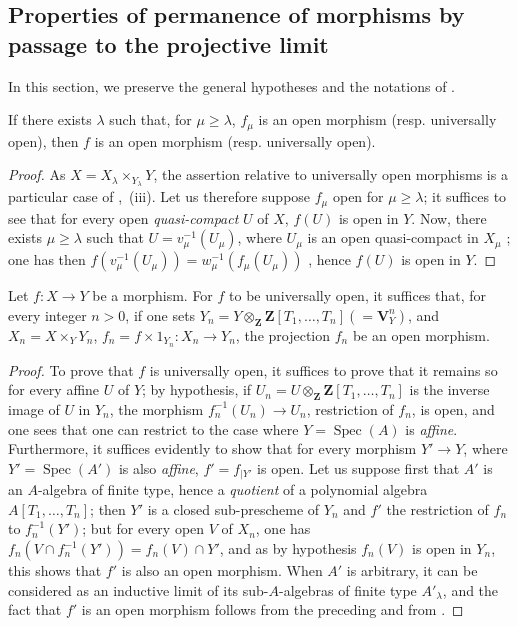 \subsection{Properties of permanence of morphisms by passage to the projective limit}
\label{subsection:IV.8.10}

In this section, we preserve the general hypotheses and the notations of .

\begin{proposition}[8.10.1]
\label{IV.8.10.1}
If there exists $\lambda$ such that, for $\mu\geqslant\lambda$, $f_\mu$ is an open morphism \textup{(resp.} universally open\textup{)}, then $f$ is an open morphism \textup{(resp.} universally open\textup{)}.
\end{proposition}

\begin{proof}
As $X=X_\lambda\times_{Y_\lambda}Y$, the assertion relative to universally open morphisms is a particular case of ,~(iii).
Let us therefore suppose $f_\mu$ open for $\mu\geqslant\lambda$; it suffices to see that for every open \emph{quasi-compact} $U$ of $X$, $f(U)$ is open in $Y$.
Now, there exists $\mu\geqslant\lambda$ such that $U=v_\mu^{-1}(U_\mu)$, where $U_\mu$ is an open quasi-compact in $X_\mu$ ; one has then $f(v_\mu^{-1}(U_\mu))=w_\mu^{-1}(f_\mu(U_\mu))$ , hence $f(U)$ is open in $Y$.
\end{proof}

\begin{corollary}[8.10.2]
\label{IV.8.10.2}
Let $f:X\to Y$ be a morphism.
For $f$ to be universally open, it suffices that, for every integer $n>0$, if one sets $Y_n=Y\otimes_\mathbf{Z}\mathbf{Z}[T_1,\ldots,T_n](=\mathbf{V}_Y^n)$, and $X_n=X\times_Y Y_n$, $f_n=f\times 1_{Y_n}:X_n\to Y_n$, the projection $f_n$ be an open morphism.
\end{corollary}

\begin{proof}
To prove that $f$ is universally open, it suffices to prove that it remains so for every affine $U$ of $Y$; by hypothesis, if $U_n=U\otimes_\mathbf{Z}\mathbf{Z}[T_1,\ldots,T_n]$ is the inverse image of $U$ in $Y_n$, the morphism $f_n^{-1}(U_n)\to U_n$, restriction of $f_n$, is open, and one sees that one can restrict to the case where $Y=\operatorname{Spec}(A)$ is \emph{affine}.
Furthermore, it suffices evidently to show that for every morphism $Y'\to Y$, where $Y'=\operatorname{Spec}(A')$ is also \emph{affine}, $f'=f_{|Y'}$ is open.
Let us suppose first that $A'$ is an $A$-algebra of finite type, hence a \emph{quotient} of a polynomial algebra $A[T_1,\ldots,T_n]$; then $Y'$ is a closed sub-prescheme of $Y_n$ and $f'$ the restriction
of $f_n$ to $f_n^{-1}(Y')$; but for every open $V$ of $X_n$, one has $f_n(V\cap f_n^{-1}(Y'))=f_n(V)\cap Y'$, and as by hypothesis $f_n(V)$ is open in $Y_n$, this shows that $f'$ is also an open morphism.
When $A'$ is arbitrary, it can be considered as an inductive limit of its sub-$A$-algebras of finite type $A'_\lambda$, and the fact that $f'$ is an open morphism follows from the preceding and from .
\end{proof}

